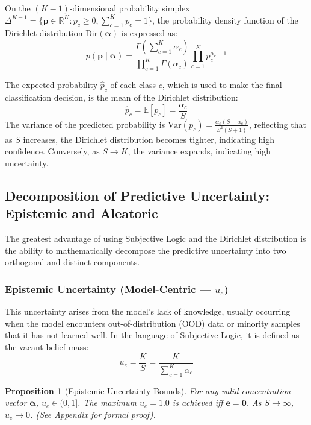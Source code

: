 \documentclass[letterpaper]{article} %
\newcommand{\Dir}{\text{Dir}}
\newcommand{\R}{\mathbb{R}}
\newcommand{\E}{\mathbb{E}}
\newtheorem{proposition}{Proposition}
\begin{document}
On the $(K{-}1)$-dimensional probability simplex $\Delta^{K-1} = \{\bm{p} \in \R^K : p_c \ge 0, \sum_{c=1}^K p_c = 1\}$, the probability density function of the Dirichlet distribution $\Dir(\bm{\alpha})$ is expressed as:
\begin{equation}\label{eq:dirichlet_pdf}
    p(\bm{p} \mid \bm{\alpha}) = \frac{\Gamma\!\left(\sum_{c=1}^K \alpha_c\right)}{\prod_{c=1}^K \Gamma(\alpha_c)} \prod_{c=1}^K p_c^{\alpha_c - 1}
\end{equation}

The expected probability $\hat{p}_c$ of each class $c$, which is used to make the final classification decision, is the mean of the Dirichlet distribution:
\begin{equation}\label{eq:p_hat}
    \hat{p}_c = \E[p_c] = \frac{\alpha_c}{S}
\end{equation}
The variance of the predicted probability is $\text{Var}(p_c) = \frac{\alpha_c(S - \alpha_c)}{S^2(S + 1)}$, reflecting that as $S$ increases, the Dirichlet distribution becomes tighter, indicating high confidence. Conversely, as $S \to K$, the variance expands, indicating high uncertainty.

\subsection{Decomposition of Predictive Uncertainty: Epistemic and Aleatoric}\label{subsec:uncertainties}

The greatest advantage of using Subjective Logic and the Dirichlet distribution is the ability to mathematically decompose the predictive uncertainty into two orthogonal and distinct components.

\subsubsection{Epistemic Uncertainty (Model-Centric --- $u_e$)}

This uncertainty arises from the model's lack of knowledge, usually occurring when the model encounters out-of-distribution (OOD) data or minority samples that it has not learned well. In the language of Subjective Logic, it is defined as the vacant belief mass:
\begin{equation}\label{eq:u_e}
    u_e = \frac{K}{S} = \frac{K}{\sum_{c=1}^K \alpha_c}
\end{equation}

\begin{proposition}[Epistemic Uncertainty Bounds]
For any valid concentration vector $\bm{\alpha}$, $u_e \in (0, 1]$. The maximum $u_e = 1.0$ is achieved iff $\bm{e} = \bm{0}$. As $S \to \infty$, $u_e \to 0$. (See Appendix for formal proof).
\end{proposition}
\end{document}
